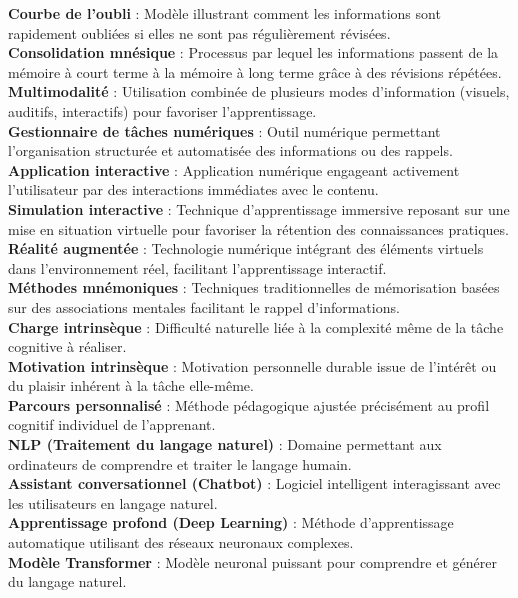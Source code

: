 \documentclass[11pt,a4paper]{report}
\begin{document}
\textbf{Courbe de l’oubli} : Modèle illustrant comment les informations sont rapidement oubliées si elles ne sont pas régulièrement révisées.\\
\textbf{Consolidation mnésique} : Processus par lequel les informations passent de la mémoire à court terme à la mémoire à long terme grâce à des révisions répétées.\\
\textbf{Multimodalité} : Utilisation combinée de plusieurs modes d’information (visuels, auditifs, interactifs) pour favoriser l'apprentissage.\\
\textbf{Gestionnaire de tâches numériques} : Outil numérique permettant l’organisation structurée et automatisée des informations ou des rappels.\\
\textbf{Application interactive} : Application numérique engageant activement l’utilisateur par des interactions immédiates avec le contenu.\\
\textbf{Simulation interactive} : Technique d'apprentissage immersive reposant sur une mise en situation virtuelle pour favoriser la rétention des connaissances pratiques.\\
\textbf{Réalité augmentée} : Technologie numérique intégrant des éléments virtuels dans l'environnement réel, facilitant l'apprentissage interactif.\\
\textbf{Méthodes mnémoniques} : Techniques traditionnelles de mémorisation basées sur des associations mentales facilitant le rappel d’informations.\\
\textbf{Charge intrinsèque} : Difficulté naturelle liée à la complexité même de la tâche cognitive à réaliser.\\
\textbf{Motivation intrinsèque} : Motivation personnelle durable issue de l'intérêt ou du plaisir inhérent à la tâche elle-même.\\
\textbf{Parcours personnalisé} : Méthode pédagogique ajustée précisément au profil cognitif individuel de l'apprenant.\\
\textbf{NLP (Traitement du langage naturel)} : Domaine permettant aux ordinateurs de comprendre et traiter le langage humain.\\
\textbf{Assistant conversationnel (Chatbot)} : Logiciel intelligent interagissant avec les utilisateurs en langage naturel.\\
\textbf{Apprentissage profond (Deep Learning)} : Méthode d’apprentissage automatique utilisant des réseaux neuronaux complexes.\\
\textbf{Modèle Transformer} : Modèle neuronal puissant pour comprendre et générer du langage naturel.\\
\end{document}

